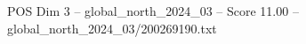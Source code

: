 \begin{textsample}{POS Dim 3 – global\_north\_2024\_03 – Score 11.00 – global\_north\_2024\_03/200269190.txt}
\end{textsample}
